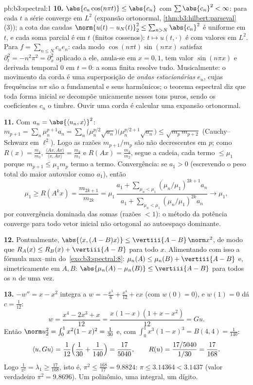 \begin{solution}{pb:b3:spectral:1}
\textbf{10.} $\abs{c_n\cos(n\pi t)} \leq \abs{c_n}$ com
$\sum\abs{c_n}^2 < \infty$: para cada $t$ a série converge
em $L^2$ (expansão ortonormal,
\cref{thm:b3:hilbert:parseval}(3)); a cota das caudas
$\norm{u(t) - u_N(t)}_2^2 \leq \sum_{n>N}\abs{c_n}^2$ é
uniforme em $t$, e cada soma parcial é  em $t$
(finitos cossenos): $t \mapsto u(t,\cdot)$ é  com valores
em $L^2$. Para $f = \sum_{n\leq N}c_ne_n$: cada modo
$\cos(n\pi t)\sin(n\pi x)$ satisfaz $\partial_t^2 =
-n^2\pi^2 = \partial_x^2$ aplicado a ele, anula-se em $x = 0,
1$, tem valor $\sin(n\pi x)$ e derivada temporal $0$ em $t =
0$: a soma finita resolve tudo. Musicalmente: o
movimento da corda é uma superposição de \emph{ondas estacionárias} $e_n$,
cujas frequências $n\pi$ são a fundamental e seus
harmônicos; o teorema espectral diz que toda forma inicial
se decompõe unicamente nesses tons puros, sendo os coeficientes
$c_n$ o timbre. Ouvir uma corda é calcular uma
expansão ortonormal.

\textbf{11.} Com $a_n = \abs{\langle u_n, x\rangle}^2$:
$m_{p+1} = \sum_n\mu_n^{p+1}a_n = \sum_n\bigl(\mu_n^{p/2}
\sqrt{a_n}\bigr)\bigl(\mu_n^{p/2+1}\sqrt{a_n}\bigr) \leq
\sqrt{m_p\,m_{p+2}}$ (Cauchy--Schwarz em $\ell^2$). Logo
as razões $m_{p+1}/m_p$ são não decrescentes em $p$; como
$R(x) = \frac{m_1}{m_0}$, $\frac{\langle Ax, Ax\rangle}
{\langle x, Ax\rangle} = \frac{m_2}{m_1}$ e $R(Ax) =
\frac{m_3}{m_2}$, segue a cadeia, cada termo $\leq \mu_1$
porque $m_{p+1} \leq \mu_1m_p$ termo a termo. Convergência: se
$a_1 > 0$ (escrevendo o peso total do maior autovalor como
$a_1$), então
\[
\mu_1 \geq R(A^kx) = \frac{m_{2k+1}}{m_{2k}} =
\mu_1\,\frac{a_1 + \sum_{\mu_n<\mu_1}(\mu_n/\mu_1)^{2k+1}
a_n}{a_1 + \sum_{\mu_n<\mu_1}(\mu_n/\mu_1)^{2k}a_n}
\longrightarrow \mu_1,
\]
por convergência dominada das somas (razões $< 1$): o
método da potência converge para todo vetor inicial não
ortogonal ao autoespaço dominante.

\textbf{12.} Pontualmente, $\abs{\langle x, (A - B)x\rangle}
\leq \vertiii{A - B}\,\norm x^2$, de modo que $R_A(x) \leq R_B(x) +
\vertiii{A - B}$ para todo $x$. Alimentando com isso a
fórmula max--min do~\cref{exo:b3:spectral:8}: $\mu_n(A)
\leq \mu_n(B) + \vertiii{A - B}$ e, simetricamente em $A,
B$: $\abs{\mu_n(A) - \mu_n(B)} \leq \vertiii{A - B}$ para
todos os $n$ de uma vez.

\textbf{13.} $-w'' = x - x^2$ integra a $w = -\frac{x^3}6
+ \frac{x^4}{12} + cx$ (com $w(0) = 0$), e $w(1) = 0$
dá $c = \frac1{12}$:
\[
w = \frac{x^4 - 2x^3 + x}{12} = \frac{x(1-x)(1 + x -
x^2)}{12} = Gu .
\]
Então $\norm u_2^2 = \int_0^1x^2(1-x)^2 = \frac1{30}$ e,
com $\int_0^1x^3(1-x)^3 = B(4,4) = \frac1{140}$:
\[
\langle u, Gu\rangle = \frac1{12}\Bigl(\frac1{30} +
\frac1{140}\Bigr) = \frac{17}{5040},
\qquad
R(u) = \frac{17/5040}{1/30} = \frac{17}{168} .
\]
Logo $\frac1{\pi^2} = \lambda_1 \geq \frac{17}{168}$, isto é,
$\pi^2 \leq \frac{168}{17} = 9.8824$: $\pi \leq 3.14364 <
3.1437$ (valor verdadeiro $\pi^2 = 9.8696$). Um polinômio, uma
integral, um dígito.


\end{solution}
